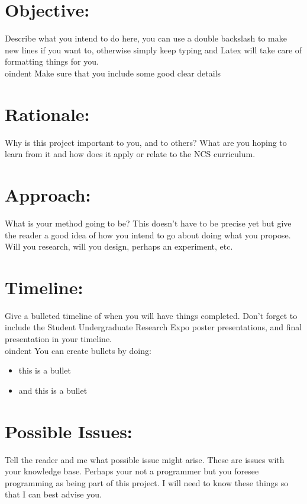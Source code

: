 \documentclass{article}
\begin{document}
    \begin{normalsize}
    
    	\section{Objective:}
        
        Describe what you intend to do here, you can use a double backslash to make new lines if you want to, otherwise simply keep typing and Latex will take care of formatting things for you. \\
        
        
oindent Make sure that you include some good clear details

		\section{Rationale:}
        
        Why is this project important to you, and to others? What are you hoping to learn from it and how does it apply or relate to the NCS curriculum. 
        
	   	\section{Approach:}
        
        What is your method going to be? This doesn't have to be precise yet but give the reader a good idea of how you intend to go about doing what you propose. Will you research, will you design, perhaps an experiment, etc. 
        
    	\section{Timeline:}
        
        Give a bulleted timeline of when you will have things completed. Don't forget to include the Student Undergraduate Research Expo poster presentations, and final presentation in your timeline. \\
        
        
oindent You can create bullets by doing:
        
        \begin{itemize}
        	\item this is a bullet
            \item and this is a bullet
        \end{itemize}
        
    	\section{Possible Issues:}
        
        Tell the reader and me what possible issue might arise. These are issues with your knowledge base. Perhaps your not a programmer but you foresee programming as being part of this project. I will need to know these things so that I can best advise you.

\end{normalsize}
  
\end{document}
